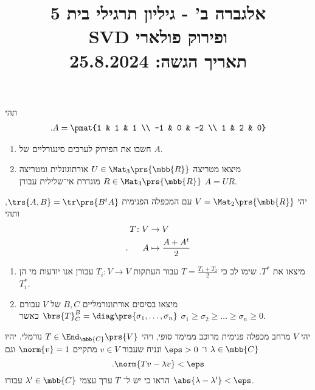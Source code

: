 \documentclass[a4paper,10pt,twoside,openany]{article}
\title{
אלגברה ב' - גיליון תרגילי בית 5 \\
\textenglish{SVD} ופירוק פולארי
\\
\vspace{1cm}
\large{תאריך הגשה: 25.8.2024}
}
\date{}
\begin{document}
\maketitle

\begin{exercise}
תהי
\begin{align*}
\text{.} A = \pmat{1 & 1 & 1 \\ -1 & 0 & -2 \\ 1 & 2 & 0}
\end{align*}

\begin{enumerate}
\item חשבו את הפירוק לערכים סינגורליים של
$A$.

\item
מיצאו מטריצה
$U \in \Mat_3\prs{\mbb{R}}$
אורתוגונלית ומטריצה
$R \in \Mat_3\prs{\mbb{R}}$
מוגדרת אי־שלילית עבורן
$A = UR$.
\end{enumerate}
\end{exercise}

\begin{exercise}
יהי
$V = \Mat_2\prs{\mbb{R}}$
עם המכפלה הפנימית
$\trs{A,B} = \tr\prs{B^t A}$,
ותהי
\begin{align*}
T \colon V &\to V \\
\text{.} \hphantom{lala} A &\mapsto \frac{A + A^t}{2}
\end{align*}

\begin{enumerate}
\item מיצאו את
$T^*$.
שימו לב כי
$T = \frac{T_1 + T_2}{2}$
עבור העתקות
$T_i \colon V \to V$
עבורן אנו יודעות מי הן
$T_i^*$.

\item
מיצאו בסיסים אורתונורמליים
$B,C$
של
$V$
עבורם
$\brs{T}^B_C = \diag\prs{\sigma_1, \ldots, \sigma_n}$
כאשר
$\sigma_1 \geq \sigma_2 \geq \ldots \geq \sigma_n \geq 0$.
\end{enumerate}
\end{exercise}

\begin{exercise}
יהי
$V$
מרחב מכפלה פנימית מרוכב ממימד סופי, ויהי
$T \in \End_{\mbb{C}}\prs{V}$
נורמלי.
יהיו $\lambda \in \mbb{C}$
ו־%
$\eps > 0$
ונניח שעבור
$v \in V$
מתקיים
$\norm{v} = 1$
וגם
\[\text{.} \norm{Tv - \lambda v} < \eps\]
הראו כי יש ל־%
$T$
ערך עצמי
$\lambda' \in \mbb{C}$
עבורו
$\abs{\lambda - \lambda'} < \eps$.
\end{exercise}
\end{document}
